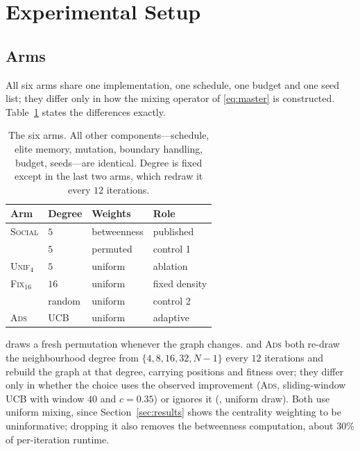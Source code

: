 \section{Experimental Setup}
\label{sec:setup}

\subsection{Arms}
\label{sec:arms}

All six arms share one implementation, one schedule, one budget and one seed
list; they differ only in how the mixing operator of \eqref{eq:master} is
constructed. Table~\ref{tab:arms} states the differences exactly.

\begin{table}[t]
\caption{The six arms. All other components---schedule, elite memory,
mutation, boundary handling, budget, seeds---are identical. Degree is fixed
except in the last two arms, which redraw it every $12$ iterations.}
\label{tab:arms}
\centering
\small
\setlength{\tabcolsep}{4pt}
\begin{tabular}{@{}llll@{}}
\toprule
Arm & Degree & Weights & Role \\
\midrule
\textsc{Social}     & $5$      & betweenness & published \\
\permcontrol{}      & $5$      & permuted    & control 1 \\
\textsc{Unif}$_4$   & $5$      & uniform     & ablation \\
\textsc{Fix}$_{16}$ & $16$     & uniform     & fixed density \\
\polcontrol{}       & random   & uniform     & control 2 \\
\textsc{Ads}        & UCB      & uniform     & adaptive \\
\bottomrule
\end{tabular}
\end{table}

\permcontrol{} draws a fresh permutation whenever the graph changes.
\polcontrol{} and \textsc{Ads} both re-draw the neighbourhood degree from
$\{4,8,16,32,N{-}1\}$ every $12$ iterations and rebuild the graph at that
degree, carrying positions and fitness over; they differ only in whether the
choice uses the observed improvement (\textsc{Ads}, sliding-window UCB with
window $40$ and $c=0.35$) or ignores it (\polcontrol{}, uniform draw). Both
use uniform mixing, since Section~\ref{sec:results} shows the centrality
weighting to be uninformative; dropping it also removes the betweenness
computation, about $30\%$ of per-iteration runtime.

